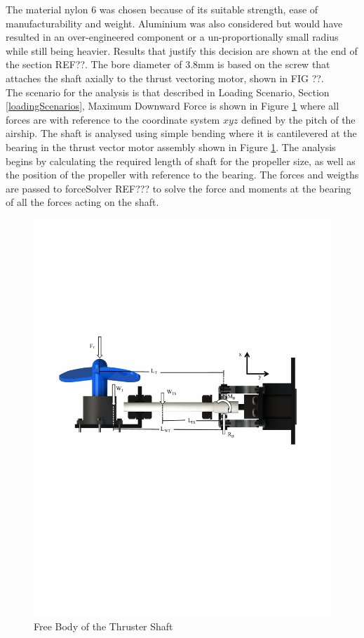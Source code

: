 \documentclass[../main.tex]{subfiles}
\begin{document}
The material nylon 6 was chosen because of its suitable strength, ease of manufacturability and weight. Aluminium was also considered but would have resulted in an over-engineered component or a un-proportionally small radius while still being heavier. Results that justify this decision are shown at the end of the section REF??. The bore diameter of 3.8mm is based on the screw that attaches the shaft axially to the thrust vectoring motor, shown in FIG ??.\\

The scenario for the analysis is that described in Loading Scenario, Section \ref{loadingScenarios}, Maximum Downward Force is shown in Figure \ref{fig:thrusterShaftFBD} where all forces are with reference to the coordinate system $xyz$ defined by the pitch of the airship. The shaft is analysed using simple bending where it is cantilevered at the bearing in the thrust vector motor assembly shown in Figure \ref{fig:thrusterShaftFBD}. The analysis begins by calculating the required length of shaft for the propeller size, as well as the position of the propeller with reference to the bearing. The forces and weigths are passed to forceSolver REF??? to solve the force and moments at the bearing of all the forces acting on the shaft.

\begin{figure}[H]
	\centering
	\includegraphics[width=.9\linewidth]{img/analysis/thruster/thrusterShaft.pdf}
	\caption{Free Body of the Thruster Shaft}
	\label{fig:thrusterShaftFBD}
\end{figure}
\end{document}
